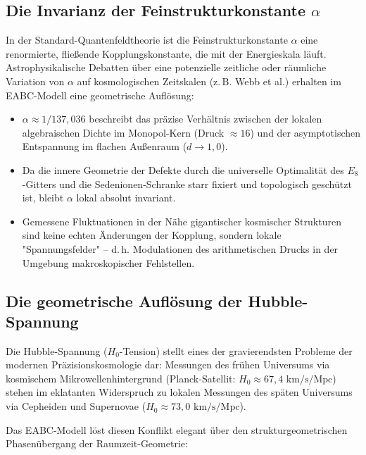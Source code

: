 \documentclass[11pt,a4paper]{article}
\newcommand{\Eoct}{E_8}
\begin{document}
\subsection{Die Invarianz der Feinstrukturkonstante $\alpha$}
In der Standard-Quantenfeldtheorie ist die Feinstrukturkonstante $\alpha$ eine renormierte, fließende Kopplungskonstante, die mit der Energieskala läuft. Astrophysikalische Debatten über eine potenzielle zeitliche oder räumliche Variation von $\alpha$ auf kosmologischen Zeitskalen (z.\,B. Webb et al.) erhalten im EABC-Modell eine geometrische Auflösung:
\begin{itemize}
    \item $\alpha \approx 1/137{,}036$ beschreibt das präzise Verhältnis zwischen der lokalen algebraischen Dichte im Monopol-Kern (Druck $\approx 16$) und der asymptotischen Entspannung im flachen Außenraum ($d \rightarrow 1{,}0$).
    \item Da die innere Geometrie der Defekte durch die universelle Optimalität des $\Eoct$-Gitters und die Sedenionen-Schranke starr fixiert und topologisch geschützt ist, bleibt $\alpha$ lokal absolut invariant. 
    \item Gemessene Fluktuationen in der Nähe gigantischer kosmischer Strukturen sind keine echten Änderungen der Kopplung, sondern lokale "Spannungsfelder" -- d.\,h. Modulationen des arithmetischen Drucks in der Umgebung makroskopischer Fehlstellen.
\end{itemize}

\subsection{Die geometrische Auflösung der Hubble-Spannung}
Die Hubble-Spannung ($H_0$-Tension) stellt eines der gravierendsten Probleme der modernen Präzisionskosmologie dar: Messungen des frühen Universums via kosmischem Mikrowellenhintergrund (Planck-Satellit: $H_0 \approx 67{,}4 \text{ km/s/Mpc}$) stehen im eklatanten Widerspruch zu lokalen Messungen des späten Universums via Cepheiden und Supernovae ($H_0 \approx 73{,}0 \text{ km/s/Mpc}$). 

Das EABC-Modell löst diesen Konflikt elegant über den strukturgeometrischen Phasenübergang der Raumzeit-Geometrie:
\end{document}
